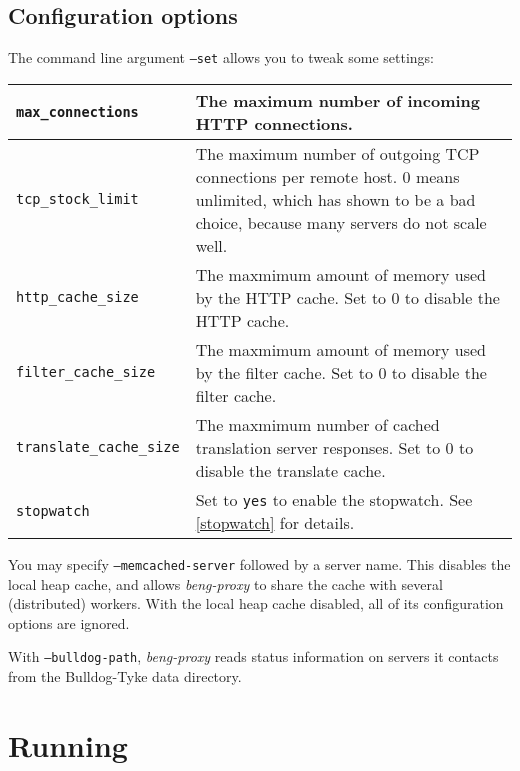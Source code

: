 \documentclass[a4paper,12pt]{article}
\begin{document}
\subsection{Configuration options}

The command line argument \texttt{--set} allows you to tweak some
settings:

\begin{longtable}{|l|p{8cm}|}
\hline

\texttt{max\_connections} & The maximum number of incoming HTTP
connections. \\
\hline

\texttt{tcp\_stock\_limit} & The maximum number of outgoing TCP
connections per remote host.  0 means unlimited, which has shown to be
a bad choice, because many servers do not scale well. \\

\hline

\texttt{http\_cache\_size} & The maxmimum amount of memory used by the
HTTP cache.  Set to 0 to disable the HTTP cache. \\

\hline

\texttt{filter\_cache\_size} & The maxmimum amount of memory used by
the filter cache.  Set to 0 to disable the filter cache. \\

\hline

\texttt{translate\_cache\_size} & The maxmimum number of cached
translation server responses.  Set to 0 to disable the translate
cache. \\

\hline

\texttt{stopwatch} & Set to \texttt{yes} to enable the stopwatch.  See
\ref{stopwatch} for details. \\

\hline
\end{longtable}

\label{memcached}
You may specify \texttt{--memcached-server} followed by a server name.
This disables the local heap cache, and allows \emph{beng-proxy} to
share the cache with several (distributed) workers.  With the local
heap cache disabled, all of its configuration options are ignored.

\label{bulldog}
With \texttt{--bulldog-path}, \emph{beng-proxy} reads status
information on servers it contacts from the Bulldog-Tyke data
directory.

\section{Running}
\end{document}
